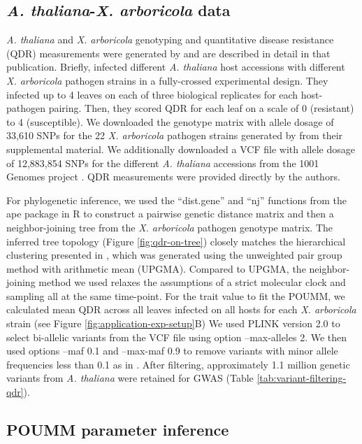 \documentclass[11pt]{article}
\begin{document}
\begin{linenumbers}
\subsection*{\emph{A. thaliana}-\emph{X. arboricola} data}
\emph{A. thaliana} and \emph{X. arboricola} genotyping and quantitative disease resistance (QDR) measurements were generated by \cite{Wang2018Two-wayGenomes} and are described in detail in that publication. Briefly, \cite{Wang2018Two-wayGenomes} infected different \emph{A. thaliana} host accessions with different \emph{X. arboricola} pathogen strains in a fully-crossed experimental design. They infected up to 4 leaves on each of three biological replicates for each host-pathogen pairing. Then, they scored QDR for each leaf on a scale of 0 (resistant) to 4 (susceptible). We downloaded the genotype matrix with allele dosage of 33,610 SNPs for the 22 \emph{X. arboricola} pathogen strains generated by \cite{Wang2018Two-wayGenomes} from their supplemental material. We additionally downloaded a VCF file with allele dosage of 12,883,854 SNPs for the different \emph{A. thaliana} accessions from the 1001 Genomes project \citep{Alonso-Blanco20161135Thaliana}. QDR measurements were provided directly by the  \cite{Wang2018Two-wayGenomes} authors.

For phylogenetic inference, we used the ``dist.gene'' and ``nj'' functions from the ape package in R to construct a pairwise genetic distance matrix and then a neighbor-joining tree from the \emph{X. arboricola} pathogen genotype matrix. The inferred tree topology (Figure \ref{fig:qdr-on-tree}) closely matches the hierarchical clustering presented in \citep{Wang2018Two-wayGenomes}, which was generated using the unweighted pair group method with arithmetic mean (UPGMA). Compared to UPGMA, the neighbor-joining method we used relaxes the assumptions of a strict molecular clock and sampling all at the same time-point. For the trait value to fit the POUMM, we calculated mean QDR across all leaves infected on all hosts for each \emph{X. arboricola} strain (see Figure \ref{fig:application-exp-setup}B) We used PLINK version 2.0 to select bi-allelic variants from the VCF file using option --max-alleles 2. We then used options --maf 0.1 and --max-maf 0.9 to remove variants with minor allele frequencies less than 0.1 as in \cite{Wang2018Two-wayGenomes}. After filtering, approximately 1.1 million genetic variants from \emph{A. thaliana} were retained for GWAS (Table \ref{tab:variant-filtering-qdr}).

\subsection*{POUMM parameter inference}


\end{linenumbers}
\end{document}
